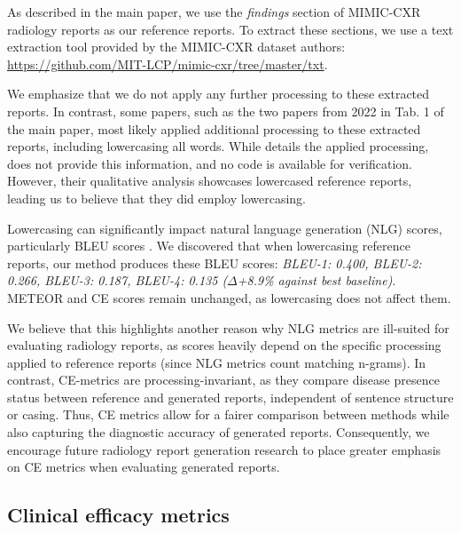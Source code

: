 \documentclass[10pt,twocolumn,letterpaper]{article}
\begin{document}
As described in the main paper, we use the \emph{findings} section of MIMIC-CXR radiology reports as our reference reports. To extract these sections, we use a text extraction tool provided by the MIMIC-CXR dataset authors: \url{https://github.com/MIT-LCP/mimic-cxr/tree/master/txt}.

We emphasize that we do not apply any further processing to these extracted reports. In contrast, some papers, such as the two papers \cite{nicolson2022improving, wang2022inclusive} from 2022 in Tab. 1 of the main paper, most likely applied additional processing to these extracted reports, including lowercasing all words. While \cite{nicolson2022improving} details the applied processing, \cite{wang2022inclusive} does not provide this information, and no code is available for verification. However, their qualitative analysis showcases lowercased reference reports, leading us to believe that they did employ lowercasing.

Lowercasing can significantly impact natural language generation (NLG) scores, particularly BLEU scores \cite{post2018call}. We discovered that when lowercasing reference reports, our method produces these BLEU scores: \emph{BLEU-1: 0.400, BLEU-2: 0.266, BLEU-3: 0.187, BLEU-4: 0.135 ($\Delta$+8.9\% against best baseline)}. METEOR and CE scores remain unchanged, as lowercasing does not affect them.

We believe that this highlights another reason why NLG metrics are ill-suited for evaluating radiology reports, as scores heavily depend on the specific processing applied to reference reports (since NLG metrics count matching n-grams). In contrast, CE-metrics are processing-invariant, as they compare disease presence status between reference and generated reports, independent of sentence structure or casing. Thus, CE metrics allow for a fairer comparison between methods while also capturing the diagnostic accuracy of generated reports. Consequently, we encourage future radiology report generation research to place greater emphasis on CE metrics when evaluating generated reports.

\subsection{Clinical efficacy metrics}
\label{clinical-efficacy-metrics}
\end{document}
